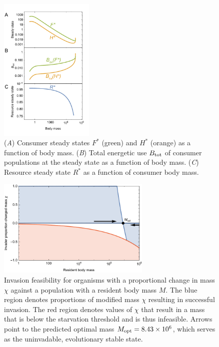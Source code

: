 \documentclass[11pt]{article}
\begin{document}
\begin{figure}
\centering
\includegraphics[width=0.4\textwidth]{fig_FPAllometric.pdf}
\caption{ (\emph{A}) Consumer steady states $F^*$ (green) and $H^*$ (orange) as a function of
  body mass. 
  (\emph{B}) Total energetic use $B_{\rm tot}$ of consumer populations at the steady state as a function of body mass.
  (\emph{C}) Resource steady state $R^*$ as a function of consumer body mass.}
\label{fig:mass}
\end{figure}  
 
\begin{figure}
\centering
\includegraphics[width=0.65\textwidth]{fig_Invasion.pdf}
\caption{ Invasion feasibility for organisms with a proportional change in
  mass $\chi$ against a population with a resident body mass $M$.  The blue
  region denotes proportions of modified mass $\chi$ resulting in successful invasion.  The
  red region denotes values of $\chi$ that result in a mass that is below the
  starvation threshold and is thus infeasible.
  Arrows point to the predicted optimal mass $M_{\rm opt}=8.43\times 10^6$, which serves as the uninvadable, evolutionary stable state.}
\label{fig:invasion}
\end{figure}  
 
\end{document}
